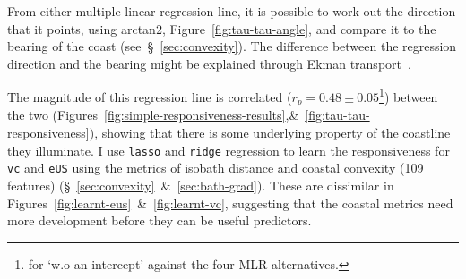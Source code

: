 






\label{sec:angle}

From either multiple linear regression line,
it is possible to work out the
direction that it points, using arctan2,
Figure~\ref{fig:tau-tau-angle}, and compare it to the bearing of the coast (see~§~\ref{sec:convexity}).
The difference between the regression direction and
the bearing might be explained through Ekman transport~\cite{hope2013hindcast}.


\label{sec:reg-metrics}

The magnitude of this regression line is correlated ($r_p=0.48\pm0.05$\footnote{
for `w.o an intercept' against the four MLR alternatives.}) between the two
(Figures~\ref{fig:simple-responsiveness-results},\&~\ref{fig:tau-tau-responsiveness}),
showing that there is some underlying property of the
coastline they illuminate.
 I use \texttt{lasso} and \texttt{ridge} regression
to learn the responsiveness for \texttt{vc} and \texttt{eUS} using the metrics of isobath
distance and coastal convexity (109 features) (§~\ref{sec:convexity}~\&~\ref{sec:bath-grad}).
These are dissimilar in Figures~\ref{fig:learnt-eus}~\&~\ref{fig:learnt-vc},
suggesting that the coastal metrics need more development before they can be
useful predictors.

\label{sec:generalisability}






\FloatBarrier
